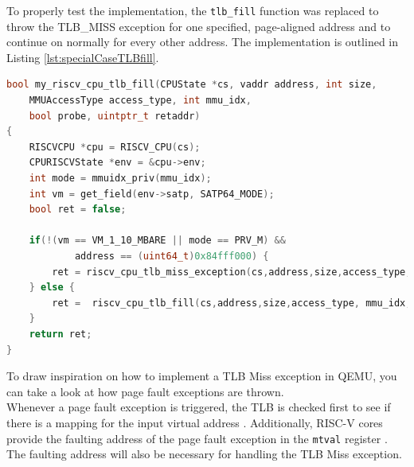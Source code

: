 
To properly test the implementation, the \texttt{tlb\_fill} function was replaced to throw the
TLB\_MISS exception for
one specified, page-aligned address and to continue on normally for every other address.
The implementation is outlined
in Listing \ref{lst:specialCaseTLBfill}.



\begin{lstlisting}[language=c,float=h!,
    caption={Alternative Implementation for the RISC-V tlb\_fill function with a special case to
    start testing TLB Miss Handler implementations.\\
    In line 11, a conditional branch is used to only trigger the exception when neither the
    Virtual Memory (as set in the \texttt{satp} \texttt{MODE} field) is bare nor the priviledge
    mode is the machine mode.\\
    If the virtual address is the hardcoded one, a TLB Miss exception is thrown, otherwise the
    original functions is called, which will perform a page table walk to find the mapping.},
    label={lst:specialCaseTLBfill}]
bool my_riscv_cpu_tlb_fill(CPUState *cs, vaddr address, int size,
    MMUAccessType access_type, int mmu_idx,
    bool probe, uintptr_t retaddr)
{
    RISCVCPU *cpu = RISCV_CPU(cs);
    CPURISCVState *env = &cpu->env;
    int mode = mmuidx_priv(mmu_idx);
    int vm = get_field(env->satp, SATP64_MODE);
    bool ret = false;

    if(!(vm == VM_1_10_MBARE || mode == PRV_M) &&
            address == (uint64_t)0x84fff000) {
        ret = riscv_cpu_tlb_miss_exception(cs,address,size,access_type, mmu_idx, probe, retaddr);
    } else {
        ret =  riscv_cpu_tlb_fill(cs,address,size,access_type, mmu_idx, probe, retaddr);
    }
    return ret;
}
\end{lstlisting}



To draw inspiration on how to implement a TLB Miss exception in QEMU, you can take a look at how
page fault exceptions are thrown.\\
Whenever a page fault exception is triggered, the TLB is checked first to see if there is a mapping
for the input virtual address \cite{QEMUSource2024}. Additionally, RISC-V cores provide the faulting
address of the page fault exception in the \texttt{mtval} register \cite{RISCVInstructionSet}.\\
The faulting address will also be necessary for handling the TLB Miss exception.


